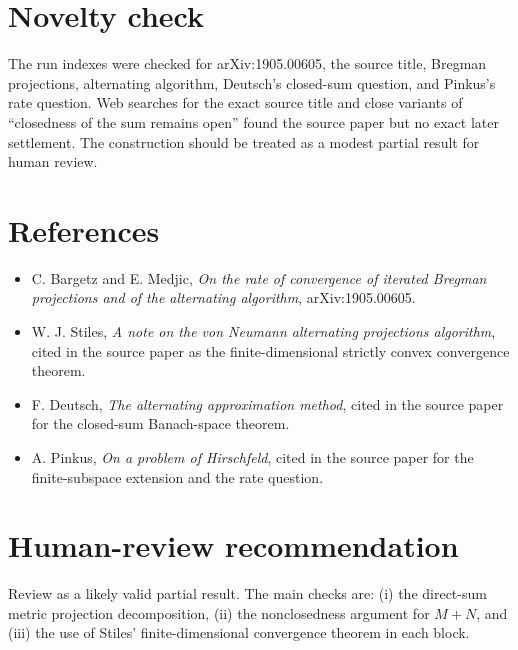 \documentclass[11pt]{article}
\begin{document}
\section*{Novelty check}

The run indexes were checked for arXiv:1905.00605, the source title, Bregman projections, alternating algorithm, Deutsch's closed-sum question, and Pinkus's rate question.  Web searches for the exact source title and close variants of ``closedness of the sum remains open'' found the source paper but no exact later settlement.  The construction should be treated as a modest partial result for human review.

\section*{References}

\begin{itemize}[leftmargin=2em]
\item C. Bargetz and E. Medjic, \emph{On the rate of convergence of iterated Bregman projections and of the alternating algorithm}, arXiv:1905.00605.
\item W. J. Stiles, \emph{A note on the von Neumann alternating projections algorithm}, cited in the source paper as the finite-dimensional strictly convex convergence theorem.
\item F. Deutsch, \emph{The alternating approximation method}, cited in the source paper for the closed-sum Banach-space theorem.
\item A. Pinkus, \emph{On a problem of Hirschfeld}, cited in the source paper for the finite-subspace extension and the rate question.
\end{itemize}

\section*{Human-review recommendation}

Review as a likely valid partial result.  The main checks are: (i) the direct-sum metric projection decomposition, (ii) the nonclosedness argument for \(M+N\), and (iii) the use of Stiles' finite-dimensional convergence theorem in each block.
\end{document}
